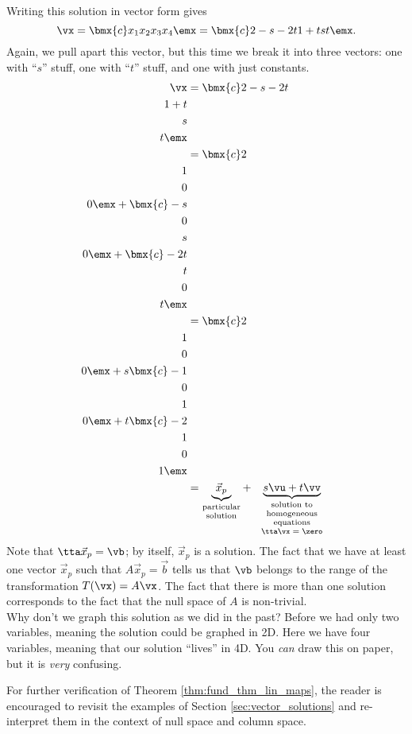 {Writing this solution in vector form gives 
\[
\vx = \bmx{c}x_1\\x_2\\x_3\\x_4\emx = \bmx{c}2-s-2t\\1+t\\s\\t\emx.
\]
Again, we pull apart this vector, but this time we break it into three vectors: one with ``$s$'' stuff, one with ``$t$'' stuff, and one with just constants. 
\begin{align*}
 \vx &= \bmx{c}2-s-2t\\1+t\\s\\t\emx \\
     &= \bmx{c}2\\1\\0\\0\emx + \bmx{c}-s\\0\\s\\0\emx + \bmx{c}-2t\\t\\0\\t\emx \\ 
     &=\bmx{c}2\\1\\0\\0\emx+s\bmx{c}-1\\0\\1\\0\emx + t\bmx{c}-2\\1\\0\\1\emx\\
     &=\underbrace{\vec{x}_p}_{\parbox{35pt}{\center {\vskip -10 pt} \scriptsize particular solution}}+\underbrace{s\vu + t\vv}_{\parbox{70pt}{\center {\vskip -10 pt} \scriptsize solution to homogeneous equations $\tta\vx=\zero$}}
\end{align*}
Note that $\tta\vec{x}_p = \vb$; by itself, $\vec{x}_p$ is a solution. The fact that we have at least one vector $\vec{x}_p$ such that $A\vec{x}_p=\vec{b}$ tells us that $\vb$ belongs to the range of the transformation $T(\vx) = A\vx$. The fact that there is more than one solution corresponds to the fact that the null space of $A$ is non-trivial.\\

Why don't we graph this solution as we did in the past? Before we had only two variables, meaning the solution could be graphed in 2D. Here we have four variables, meaning that our solution ``lives'' in 4D. You \textit{can} draw this on paper, but it is \textit{very} confusing.}

\medskip

For further verification of Theorem \ref{thm:fund_thm_lin_maps}, the reader is encouraged to revisit the examples of Section \ref{sec:vector_solutions} and re-interpret them in the context of null space and column space.\\



